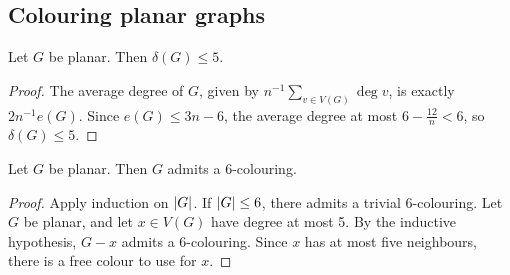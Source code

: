 \subsection{Colouring planar graphs}
\begin{proposition}
	Let \( G \) be planar.
	Then \( \delta(G) \leq 5 \).
\end{proposition}
\begin{proof}
	The average degree of \( G \), given by \( n^{-1} \sum_{v \in V(G)} \deg v \), is exactly \( 2 n^{-1} e(G) \).
	Since \( e(G) \leq 3n - 6 \), the average degree at most \( 6 - \frac{12}{n} < 6 \), so \( \delta(G) \leq 5 \).
\end{proof}
\begin{proposition}
	Let \( G \) be planar.
	Then \( G \) admits a 6-colouring.
\end{proposition}
\begin{proof}
	Apply induction on \( \abs{G} \).
	If \( \abs{G} \leq 6 \), there admits a trivial 6-colouring.
	Let \( G \) be planar, and let \( x \in V(G) \) have degree at most 5.
	By the inductive hypothesis, \( G - x \) admits a 6-colouring.
	Since \( x \) has at most five neighbours, there is a free colour to use for \( x \).
\end{proof}
